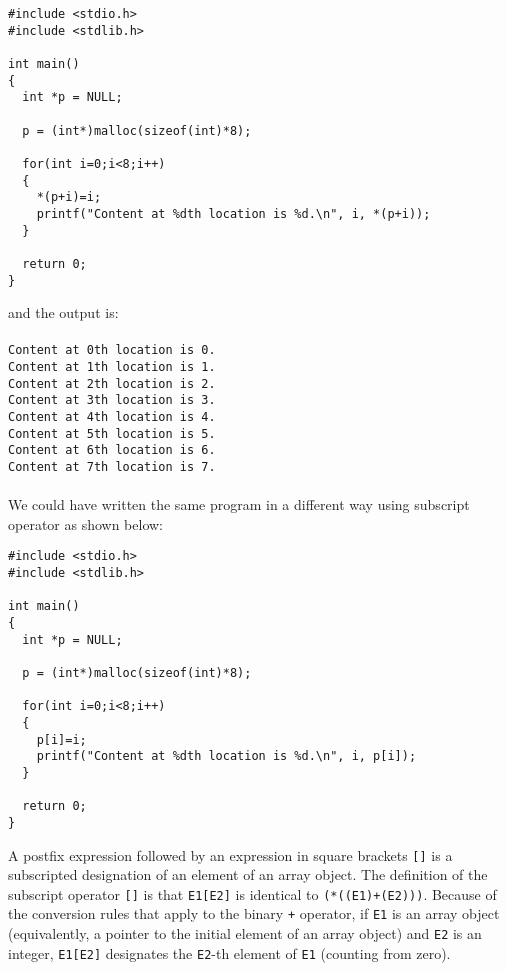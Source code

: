 \begin{verbatim}
#include <stdio.h>
#include <stdlib.h>

int main()
{
  int *p = NULL;

  p = (int*)malloc(sizeof(int)*8);

  for(int i=0;i<8;i++)
  {
    *(p+i)=i;
    printf("Content at %dth location is %d.\n", i, *(p+i));
  }

  return 0;
}
\end{verbatim}
and the output is:
\\\\\texttt{Content at 0th location is 0.\\
Content at 1th location is 1.\\
Content at 2th location is 2.\\
Content at 3th location is 3.\\
Content at 4th location is 4.\\
Content at 5th location is 5.\\
Content at 6th location is 6.\\
Content at 7th location is 7.\\\\}
We could have written the same program in a different way using subscript
operator as shown below:

\begin{verbatim}
#include <stdio.h>
#include <stdlib.h>

int main()
{
  int *p = NULL;

  p = (int*)malloc(sizeof(int)*8);

  for(int i=0;i<8;i++)
  {
    p[i]=i;
    printf("Content at %dth location is %d.\n", i, p[i]);
  }

  return 0;
}
\end{verbatim}

A postfix expression followed by an expression in square brackets \texttt{[]}
is a subscripted designation of an element of an array object. The definition
of the subscript operator \texttt{[]} is that \texttt{E1[E2]} is identical to
\texttt{(*((E1)+(E2)))}. Because of the conversion rules that apply to the
binary \texttt{+} operator, if \texttt{E1} is an array object (equivalently, a
pointer to the initial element of an array object) and \texttt{E2} is an
integer, \texttt{E1[E2]} designates the \texttt{E2}-th element of \texttt{E1}
(counting from zero).

